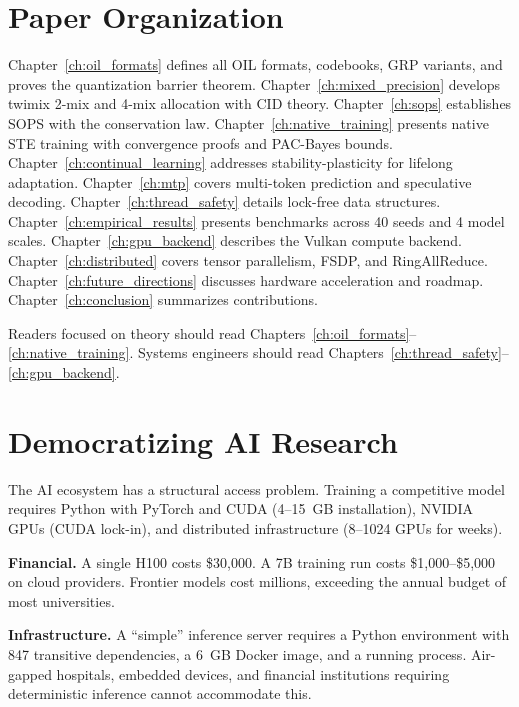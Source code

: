 \section{Paper Organization}
\label{sec:organization}

Chapter~\ref{ch:oil_formats} defines all OIL formats, codebooks, GRP
variants, and proves the quantization barrier theorem. Chapter~\ref{ch:mixed_precision}
develops twimix 2-mix and 4-mix allocation with CID theory.
Chapter~\ref{ch:sops} establishes SOPS with the conservation law.
Chapter~\ref{ch:native_training} presents native STE training with
convergence proofs and PAC-Bayes bounds. Chapter~\ref{ch:continual_learning}
addresses stability-plasticity for lifelong adaptation. Chapter~\ref{ch:mtp}
covers multi-token prediction and speculative decoding. Chapter~\ref{ch:thread_safety}
details lock-free data structures. Chapter~\ref{ch:empirical_results}
presents benchmarks across 40 seeds and 4 model scales. Chapter~\ref{ch:gpu_backend}
describes the Vulkan compute backend. Chapter~\ref{ch:distributed} covers
tensor parallelism, FSDP, and RingAllReduce. Chapter~\ref{ch:future_directions}
discusses hardware acceleration and roadmap. Chapter~\ref{ch:conclusion}
summarizes contributions.

Readers focused on theory should read
Chapters~\ref{ch:oil_formats}--\ref{ch:native_training}. Systems engineers
should read Chapters~\ref{ch:thread_safety}--\ref{ch:gpu_backend}.

\section{Democratizing AI Research}
\label{sec:democratization}

The AI ecosystem has a structural access problem. Training a competitive model
requires Python with PyTorch and CUDA (4--15~GB installation), NVIDIA GPUs
(CUDA lock-in), and distributed infrastructure (8--1024 GPUs for weeks).

\textbf{Financial.} A single H100 costs \$30{,}000. A 7B training run costs
\$1{,}000--\$5{,}000 on cloud providers. Frontier models cost millions,
exceeding the annual budget of most universities.

\textbf{Infrastructure.} A ``simple'' inference server requires a Python
environment with 847 transitive dependencies, a 6~GB Docker image, and a
running process. Air-gapped hospitals, embedded devices, and financial
institutions requiring deterministic inference cannot accommodate this.

